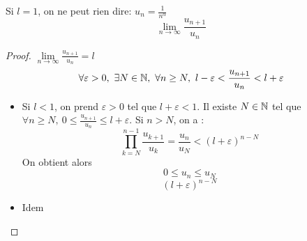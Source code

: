 \documentclass[../main.tex]{subfile}
\begin{document}
\begin{rema}
	Si $l = 1$, on ne peut rien dire:
	$u_n = \frac{1}{n^\alpha}$\\
	$$\lim\limits_{n \to \infty} \frac{u_{n+1}}{u_n}$$
\end{rema}

\begin{proof}
	$\lim\limits_{n \to \infty} \frac{u_{n+1}}{u_n} = l$\\
	$$\forall \varepsilon > 0, \ \exists N \in \mathbb{N}, \ \forall n \geq N, \ l-\varepsilon < \frac{u_{n+1}}{u_n} < l + \varepsilon$$
\begin{itemize}	
	\item Si $l < 1$, on prend $\varepsilon > 0$ tel que $l+ \varepsilon < 1$. 
	Il existe $N \in \mathbb{N}$ tel que $\forall n \geq N, \ 0 \leq \frac{u_{n+1}}{u_n} \leq l + \varepsilon$.
	Si $n > N$, on a :
	$$\prod\limits_{k = N}^{n-1} \frac{u_{k+1}}{u_k} = \frac{u_n}{u_N} < (l + \varepsilon)^{n - N}$$
	On obtient alors 
	$$0 \leq u_n \leq u_N$$
	$$(l + \varepsilon)^{n - N}$$%
	\item Idem 
\end{itemize}
\end{proof}
\end{document}
